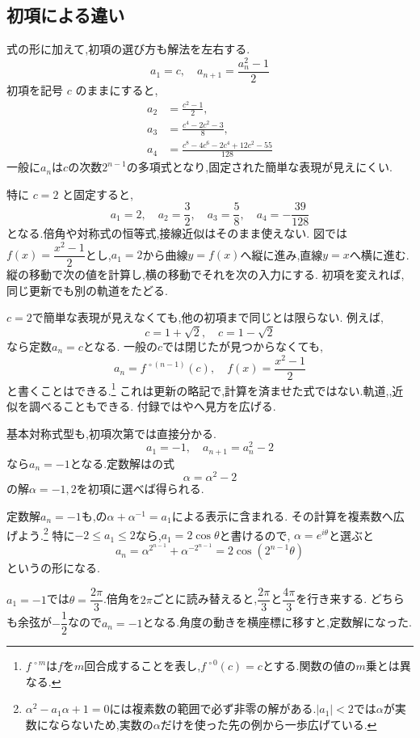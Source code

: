 \subsection{初項による違い}\label{節：初項依存型}

式の形に加えて,初項の選び方も解法を左右する.
\[
  a_1=c,
  \quad
  a_{n+1}=\frac{a_n^2-1}{2}
\]
初項を記号 $c$ のままにすると,
\begin{align*}
  a_2&=\frac{c^2-1}{2},\\
  a_3&=\frac{c^4-2c^2-3}{8},\\
  a_4&=\frac{c^8-4c^6-2c^4+12c^2-55}{128}
\end{align*}
一般に$a_n$は$c$の次数$2^{n-1}$の多項式となり,固定された簡単な表現が見えにくい.

特に $c=2$ と固定すると,
\[
  a_1=2,
  \quad
  a_2=\frac{3}{2},
  \quad
  a_3=\frac{5}{8},
  \quad
  a_4=-\frac{39}{128}
\]
となる.倍角や対称式の恒等式,接線近似はそのまま使えない.
  図では$f(x)=\dfrac{x^2-1}{2}$とし,$a_1=2$から曲線$y=f(x)$へ縦に進み,直線$y=x$へ横に進む.
  縦の移動で次の値を計算し,横の移動でそれを次の入力にする.
  初項を変えれば,同じ更新でも別の軌道をたどる.
  \BookFigCobweb

$c=2$で簡単な表現が見えなくても,他の初項まで同じとは限らない.
例えば,
\[
  c=1+\sqrt{2},
  \quad
  c=1-\sqrt{2}
\]
なら定数$a_n=c$となる.
一般の$c$では閉じたが見つからなくても,
\[
  a_n=f^{\,\circ(n-1)}(c),
  \quad
  f(x)=\frac{x^2-1}{2}
\]
と書くことはできる.\footnote{$f^{\,\circ m}$は$f$を$m$回合成することを表し,$f^{\,\circ0}(c)=c$とする.関数の値の$m$乗とは異なる.}
これは更新の略記で,計算を済ませた式ではない.軌道,,近似を調べることもできる.
付録ではやへ見方を広げる.

基本対称式型も,初項次第では直接分かる.
\[
  a_1=-1,\quad a_{n+1}=a_n^2-2
\]
なら$a_n=-1$となる.定数解はの式
\[
  \alpha=\alpha^2-2
\]
の解$\alpha=-1,2$を初項に選べば得られる.

定数解$a_n=-1$も,の$\alpha+\alpha^{-1}=a_1$による表示に含まれる.
その計算を複素数へ広げよう.\footnote{$\alpha^2-a_1\alpha+1=0$には複素数の範囲で必ず非零の解がある.$|a_1|<2$では$\alpha$が実数にならないため,実数の$\alpha$だけを使った先の例から一歩広げている.}
特に$-2\le a_1\le2$なら,$a_1=2\cos\theta$と書けるので,
$\alpha=e^{i\theta}$と選ぶと
\[
  a_n=\alpha^{2^{n-1}}+\alpha^{-2^{n-1}}=2\cos(2^{n-1}\theta)
\]
というの形になる.

$a_1=-1$では$\theta=\dfrac{2\pi}{3}$.倍角を$2\pi$ごとに読み替えると,$\dfrac{2\pi}{3}$と$\dfrac{4\pi}{3}$を行き来する.
どちらも余弦が$-\dfrac{1}{2}$なので$a_n=-1$となる.角度の動きを横座標に移すと,定数解になった.
